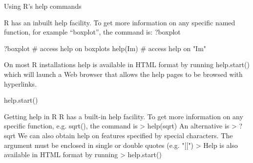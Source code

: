 \begin{frame}

Using R's help commands

R has an inbuilt help facility. To get more information on any specific named function, for example “boxplot”, the command is: ?boxplot


?boxplot		# access help on boxplots
help(Im)        # access help on "Im"



On most R installations help is available in HTML format by running help.start() which will launch a Web browser that allows the help pages to be browsed with hyperlinks. 
 



help.start()



Getting help in R
R has a built-in help facility. To get more information on any specific function, e.g. sqrt(), the command is
> help(sqrt)
An alternative is
> ? sqrt
We can also obtain help on features specified by special characters.
The argument must be enclosed in single or double quotes (e.g. "[[")
> 
Help is also available in HTML format by running
> help.start()


\end{frame}

